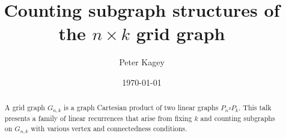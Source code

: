 \documentclass[notitlepage]{report}
\title{Counting subgraph structures of the $n \times k$ grid graph}
\author{Peter Kagey}
\date{\today}
\begin{document}
\maketitle

\begin{abstract}
	A grid graph $G_{n,k}$ is a graph Cartesian product of two linear graphs
	$P_n \square P_k$. This talk presents a family of linear recurrences that
	arise from fixing $k$ and counting subgraphs on $G_{n,k}$ with various vertex
	and connectedness conditions.
\end{abstract}
\end{document}
